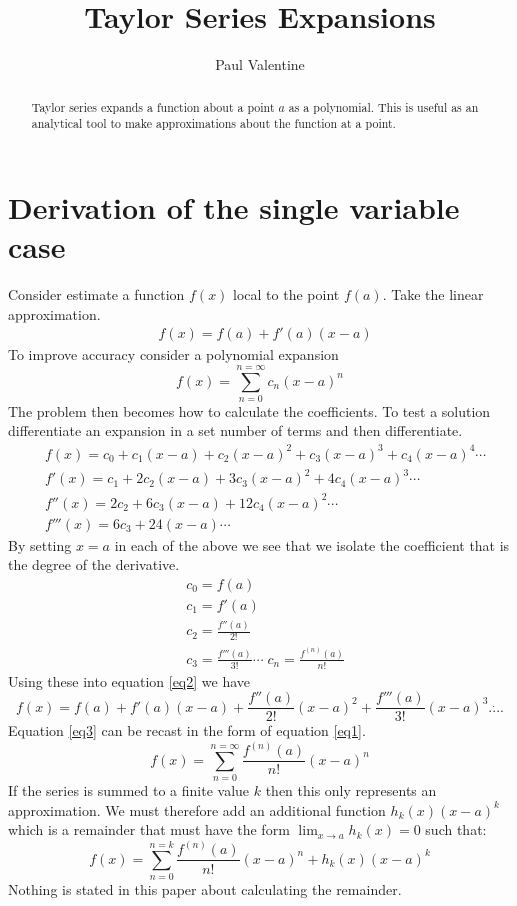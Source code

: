 \documentclass[a4paper]{article}
\title{\textbf{Taylor Series Expansions}}
\author{Paul Valentine}
\begin{document}
\maketitle
\begin{abstract}
Taylor series expands a function about a point $a$ as a polynomial. This is useful as an analytical tool to make approximations about the function at a point.
\end{abstract}
\section{Derivation of the single variable case}
Consider estimate a function $f(x)$ local to the point $f(a)$. Take the linear approximation.
\begin{align}
&f(x) = f(a)+f'(a)(x-a)
\end{align}
To improve accuracy consider a polynomial expansion
\begin{equation}
\label{eq1}
f(x)=\sum_{n=0}^{n=\infty}	c_n (x-a)^n
\end{equation}
The problem then becomes how to calculate the coefficients. To test a solution differentiate an expansion in a set number of terms and then differentiate.
\begin{align}
&f(x) = c_0 + c_1 (x-a) + c_2 (x-a)^2 + c_3 (x-a)^3 + c_4 (x-a)^4\cdots\label{eq2}\\
&f'(x) = c_1 + 2 c_2 (x-a) + 3c_3 (x-a)^2 +4c_4 (x-a)^3 \cdots\\
&f''(x) = 2 c_2 + 6c_3(x-a) + 12c_4(x-a)^2\cdots\\
&f'''(x)=6c_3 + 24(x-a) \cdots
\end{align}
By setting $x=a$ in each of the above we see that we isolate the coefficient that is the degree of the derivative.
\begin{align}
&c_0 = f(a)\\
&c_1 = f'(a)\\
&c_2 = \frac{f''(a)}{2!}\\
&c_3 = \frac{f'''(a)}{3!}\cdots\; c_n =\frac{f^{(n)}(a)}{n!}
\end{align}
Using these into equation \ref{eq2} we have
\begin{equation}
\label{eq3}
f(x) = f(a) + f'(a)(x-a) + \frac{f''(a)}{2!}(x-a)^2+\frac{f'''(a)}{3!}(x-a)^3 \dot{....}
\end{equation}
Equation \ref{eq3} can be recast in the form of equation \ref{eq1}.
\begin{equation}
f(x)=\sum_{n=0}^{n=\infty} \frac{f^{(n)}(a)}{n!} (x-a)^n
\end{equation}
If the series is summed to a finite value $k$ then this only represents an approximation. We must therefore add an additional function $h_k(x)(x-a)^k$ which is a remainder that must have the form $\displaystyle{\lim_{x\to a}}h_k(x)=0$ such that:
\begin{equation}
f(x)=\sum_{n=0}^{n=k} \frac{f^{(n)}(a)}{n!} (x-a)^n +h_k(x)(x-a)^k
\end{equation}
Nothing is stated in this paper about calculating the remainder.

\end{document}
